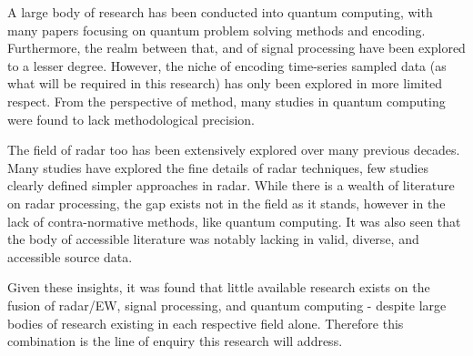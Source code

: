A large body of research has been conducted into quantum computing, with many papers focusing on quantum problem solving methods and encoding.
Furthermore, the realm between that, and of signal processing have been explored to a lesser degree.
However, the niche of encoding time-series sampled data (as what will be required in this research) has only been explored in more limited respect.
From the perspective of method, many studies in quantum computing were found to lack methodological precision.

The field of radar too has been extensively explored over many previous decades.
Many studies have explored the fine details of radar techniques, few studies clearly defined simpler approaches in radar.
While there is a wealth of literature on radar processing, the gap exists not in the field as it stands, however in the lack of contra-normative methods, like quantum computing.
It was also seen that the body of accessible literature was notably lacking in valid, diverse, and accessible source data.

Given these insights, it was found that little available research exists on the fusion of radar/\ac{EW}, signal processing, and quantum computing - despite large bodies of research existing in each respective field alone.
Therefore this combination is the line of enquiry this research will address.


